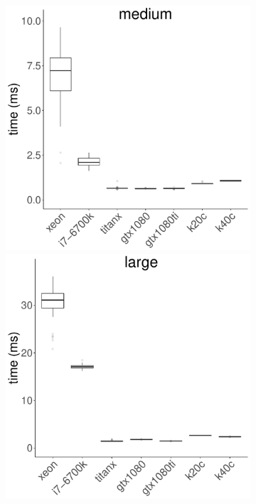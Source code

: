 \documentclass[../document.tex]{subfiles}
\begin{document}
\begin{figure}
\begin{subfigure}{0.9\textwidth}
		\includegraphics[width=\plotwidth]{figures/time-results/generate_fft_medium_boxplot-1}
		\includegraphics[width=\plotwidth]{figures/time-results/generate_fft_large_boxplot-1}
		\end{subfigure}


\end{figure}
\end{document}
